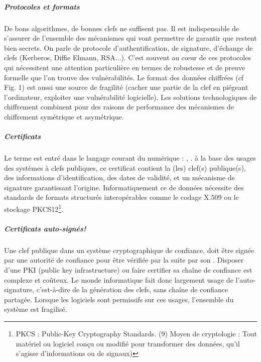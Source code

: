 \subparagraph{Protocoles et formats}
De bons algorithmes, de bonnes clefs ne suffisent pas. Il est indispensable de s'assurer de l'ensemble des mécanismes qui vont permettre de garantir que  restent bien secrets. On parle de protocole d'authentification, de signature, d'échange de clefs (Kerberos, Diffie Elmann, RSA...). C'est souvent au cœur de ces protocoles qui nécessitent une attention particulière en termes de robustesse et de preuve formelle que l'on trouve des vulnérabilités. Le format des données chiffrées (cf Fig. 1) est aussi une source de fragilité (cacher une partie de la clef en piégeant l'ordinateur, exploiter une vulnérabilité logicielle). Les solutions technologiques de chiffrement combinent pour des raisons de performance des mécanismes de chiffrement symétrique et asymétrique.
\subparagraph{Certificats}
Le terme  est entré dans le langage courant du numérique : , . à la base des usages des systèmes à clefs publiques, ce certificat contient la (les) clef(s) publique(s), des informations d'identification, des dates de validité, et un mécanisme de signature garantissant l'origine. Informatiquement ce  de données nécessite des standards de formats structurés interopérables comme le codage X.509 ou le stockage PKCS12\footnote{ PKCS : Public-Key Cryptography Standards. (9) Moyen de cryptologie : Tout matériel ou logiciel conçu ou modifié pour transformer des données, qu'il s'agisse d'informations ou de signaux)}.






\subparagraph{Certificats auto-signés!}
Une clef publique  dans un système cryptographique de confiance, doit être signée par une autorité de confiance pour être vérifiée par la suite par son . Disposer d'une PKI (public key infrastructure) ou faire certifier sa chaîne de confiance est complexe et coûteux. Le monde informatique fait donc largement usage de l'auto-signature, c'est-à-dire de la génération des clefs, sans chaîne de confiance partagée. Lorsque les logiciels sont permissifs sur ces usages, l'ensemble du système est fragilisé.


